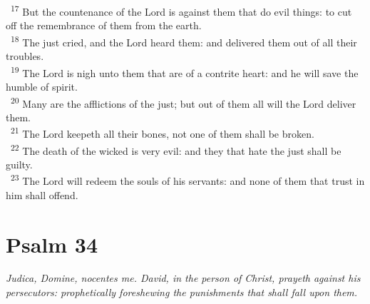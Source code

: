 \documentclass[a5paper,12pt]{article}
\begin{document}
\begin{multicols*}{2}
~\textsuperscript{17} But the countenance of the Lord is against them that do evil things: to cut off the remembrance of them from the earth.\\
~\textsuperscript{18} The just cried, and the Lord heard them: and delivered them out of all their troubles.\\
~\textsuperscript{19} The Lord is nigh unto them that are of a contrite heart: and he will save the humble of spirit.\\
~\textsuperscript{20} Many are the afflictions of the just; but out of them all will the Lord deliver them.\\
~\textsuperscript{21} The Lord keepeth all their bones, not one of them shall be broken.\\
~\textsuperscript{22} The death of the wicked is very evil: and they that hate the just shall be guilty.\\
~\textsuperscript{23} The Lord will redeem the souls of his servants: and none of them that trust in him shall offend.\\

\section{Psalm 34}
\label{sec:org262183d}
\emph{Judica, Domine, nocentes me. David, in the person of Christ, prayeth against his persecutors: prophetically foreshewing the punishments that shall fall upon them.}\\


\end{multicols*}
\end{document}
